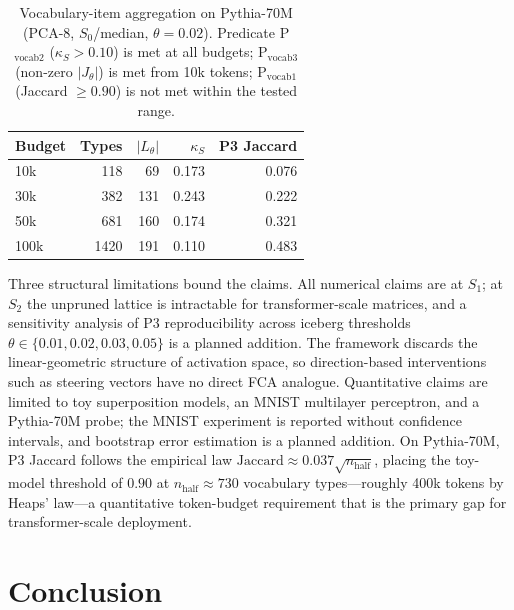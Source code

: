 \documentclass[a4paper,fleqn]{cas-dc}
\newcommand{\kS}{\kappa_S}
\begin{document}
\begin{table}[ht]
\caption{Vocabulary-item aggregation on Pythia-70M (PCA-8, $S_0$/median, $\theta=0.02$). Predicate P$_{\text{vocab2}}$ ($\kS > 0.10$) is met at all budgets; P$_{\text{vocab3}}$ (non-zero $|J_\theta|$) is met from 10k tokens; P$_{\text{vocab1}}$ (Jaccard $\geq 0.90$) is not met within the tested range.}\label{tbl:vocab_agg}
\centering\small
\begin{tabular*}{\columnwidth}{@{}lrrrr@{}}
\toprule
Budget & Types & $|L_\theta|$ & $\kS$ & P3 Jaccard \\
\midrule
10k  &  118 &  69 & 0.173 & 0.076 \\
30k  &  382 & 131 & 0.243 & 0.222 \\
50k  &  681 & 160 & 0.174 & 0.321 \\
100k & 1420 & 191 & 0.110 & 0.483 \\
\bottomrule
\end{tabular*}
\end{table}

Three structural limitations bound the claims.
All numerical claims are at $S_1$; at $S_2$ the unpruned lattice is intractable for transformer-scale matrices, and a sensitivity analysis of P3 reproducibility across iceberg thresholds $\theta \in \{0.01, 0.02, 0.03, 0.05\}$ is a planned addition.
The framework discards the linear-geometric structure of activation space, so direction-based interventions such as steering vectors have no direct FCA analogue.
Quantitative claims are limited to toy superposition models, an MNIST multilayer perceptron, and a Pythia-70M probe; the MNIST experiment is reported without confidence intervals, and bootstrap error estimation is a planned addition.
On Pythia-70M, P3 Jaccard follows the empirical law $\text{Jaccard} \approx 0.037\sqrt{n_{\text{half}}}$, placing the toy-model threshold of $0.90$ at $n_{\text{half}} \approx 730$ vocabulary types---roughly 400k tokens by Heaps' law---a quantitative token-budget requirement that is the primary gap for transformer-scale deployment.

\section{Conclusion}\label{sec:conclusion}
\end{document}
